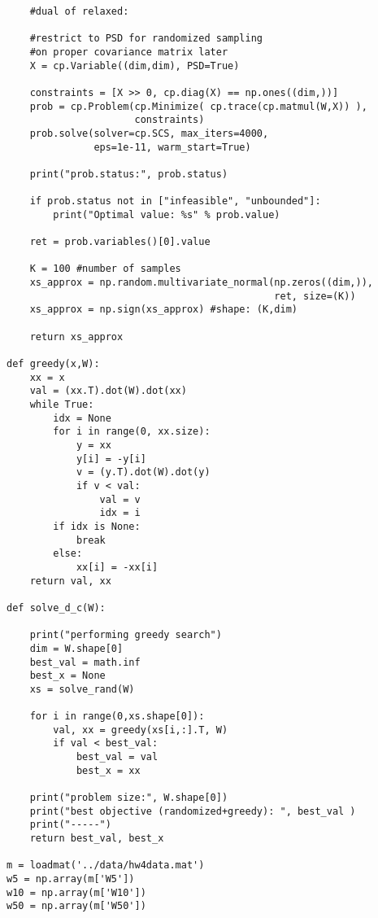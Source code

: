 \documentclass[12pt,letter]{article}
\begin{document}
\begin{enumerate}
\begin{enumerate}
\begin{itemize}
\begin{verbatim}
    #dual of relaxed:

    #restrict to PSD for randomized sampling
    #on proper covariance matrix later
    X = cp.Variable((dim,dim), PSD=True)
    
    constraints = [X >> 0, cp.diag(X) == np.ones((dim,))]
    prob = cp.Problem(cp.Minimize( cp.trace(cp.matmul(W,X)) ),
                      constraints)
    prob.solve(solver=cp.SCS, max_iters=4000,
               eps=1e-11, warm_start=True)

    print("prob.status:", prob.status)
    
    if prob.status not in ["infeasible", "unbounded"]:
        print("Optimal value: %s" % prob.value)
    
    ret = prob.variables()[0].value

    K = 100 #number of samples
    xs_approx = np.random.multivariate_normal(np.zeros((dim,)),
                                              ret, size=(K))
    xs_approx = np.sign(xs_approx) #shape: (K,dim)

    return xs_approx
    
def greedy(x,W):
    xx = x
    val = (xx.T).dot(W).dot(xx)
    while True:
        idx = None
        for i in range(0, xx.size):
            y = xx
            y[i] = -y[i]
            v = (y.T).dot(W).dot(y)
            if v < val:
                val = v
                idx = i
        if idx is None:
            break
        else:
            xx[i] = -xx[i]
    return val, xx

def solve_d_c(W):
    
    print("performing greedy search")
    dim = W.shape[0]
    best_val = math.inf
    best_x = None
    xs = solve_rand(W)
    
    for i in range(0,xs.shape[0]):
        val, xx = greedy(xs[i,:].T, W)
        if val < best_val:
            best_val = val
            best_x = xx
            
    print("problem size:", W.shape[0])
    print("best objective (randomized+greedy): ", best_val )
    print("-----")
    return best_val, best_x

m = loadmat('../data/hw4data.mat')
w5 = np.array(m['W5'])
w10 = np.array(m['W10'])
w50 = np.array(m['W50'])


\end{verbatim}
\end{itemize}
\end{enumerate}
\end{enumerate}
\end{document}
